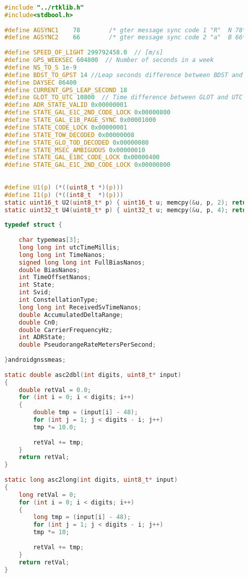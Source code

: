 \begin{lstlisting}[language=c]
	
	#include "../rtklib.h"
	#include<stdbool.h>
	
	#define AGSYNC1    78        /* gter message sync code 1 "R"  N 78*/
	#define AGSYNC2    66        /* gter message sync code 2 "a"  B 66*/
	
	#define SPEED_OF_LIGHT 299792458.0  // [m/s]
	#define GPS_WEEKSEC 604800  // Number of seconds in a week
	#define NS_TO_S 1e-9 
	#define BDST_TO_GPST 14 //Leap seconds difference between BDST and GPST
	#define DAYSEC 86400
	#define CURRENT_GPS_LEAP_SECOND 18
	#define GLOT_TO_UTC 10800  // Time difference between GLOT and UTC in seconds
	#define ADR_STATE_VALID 0x00000001
	#define STATE_GAL_E1C_2ND_CODE_LOCK 0x00000800
	#define STATE_GAL_E1B_PAGE_SYNC 0x00001000
	#define STATE_CODE_LOCK 0x00000001
	#define STATE_TOW_DECODED 0x00000008
	#define STATE_GLO_TOD_DECODED 0x00000080
	#define STATE_MSEC_AMBIGUOUS 0x00000010
	#define STATE_GAL_E1BC_CODE_LOCK 0x00000400
	#define STATE_GAL_E1C_2ND_CODE_LOCK 0x00000800
	
	
	#define U1(p) (*((uint8_t *)(p)))
	#define I1(p) (*((int8_t  *)(p)))
	static uint16_t U2(uint8_t* p) { uint16_t u; memcpy(&u, p, 2); return u; }
	static uint32_t U4(uint8_t* p) { uint32_t u; memcpy(&u, p, 4); return u; }
	
	typedef struct {
		
		char typemeas[3];
		long long int utcTimeMillis;
		long long int TimeNanos;
		signed long long int FullBiasNanos;
		double BiasNanos;
		int TimeOffsetNanos;
		int State;
		int Svid;
		int ConstellationType;
		long long int ReceivedSvTimeNanos;
		double AccumulatedDeltaRange;
		double Cn0;
		double CarrierFrequencyHz;
		int ADRState;
		double PseudorangeRateMetersPerSecond;
		
	}androidgnssmeas;
	
	static double asc2dbl(int digits, uint8_t* input)
	{
		double retVal = 0.0;
		for (int i = 0; i < digits; i++)
		{
			double tmp = (input[i] - 48);
			for (int j = 1; j < digits - i; j++)
			tmp *= 10.0;
			
			retVal += tmp;
		}
		return retVal;
	}
	
	static long asc2long(int digits, uint8_t* input)
	{
		long retVal = 0;
		for (int i = 0; i < digits; i++)
		{
			long tmp = (input[i] - 48);
			for (int j = 1; j < digits - i; j++)
			tmp *= 10;
			
			retVal += tmp;
		}
		return retVal;
	}
	

\end{lstlisting}
